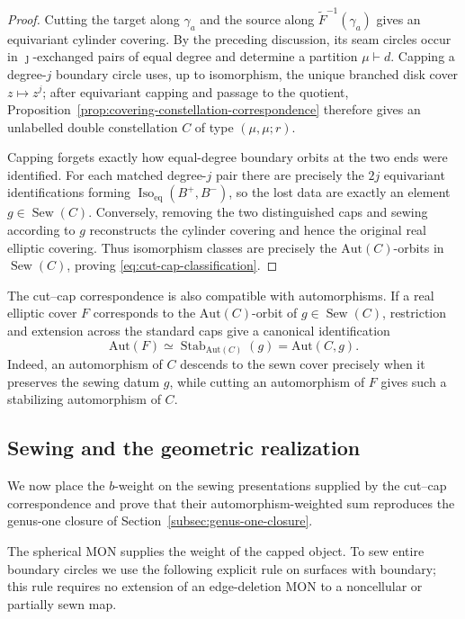 \documentclass[11pt,a4paper,reqno]{article}
\theoremstyle{definition}
\theoremstyle{remark}
\newcommand\Aut{{\mathrm{Aut}}}
\begin{document}
\begin{proof}
Cutting the target along $\gamma_a$ and the source along $\widetilde F^{-1}(\gamma_a)$ gives an equivariant cylinder covering.  By the preceding discussion, its seam circles occur in $\jmath$-exchanged pairs of equal degree and determine a partition $\mu\vdash d$.  Capping a degree-$j$ boundary circle uses, up to isomorphism, the unique branched disk cover $z\mapsto z^j$; after equivariant capping and passage to the quotient, Proposition~\ref{prop:covering-constellation-correspondence} therefore gives an unlabelled double constellation $C$ of type $(\mu,\mu;r)$.

Capping forgets exactly how equal-degree boundary orbits at the two ends were identified.  For each matched degree-$j$ pair there are precisely the $2j$ equivariant identifications forming $\operatorname{Iso}_{\mathrm{eq}}(B^+,B^-)$, so the lost data are exactly an element $g\in\operatorname{Sew}(C)$.  Conversely, removing the two distinguished caps and sewing according to $g$ reconstructs the cylinder covering and hence the original real elliptic covering.  Thus isomorphism classes are precisely the $\Aut(C)$-orbits in $\operatorname{Sew}(C)$, proving \eqref{eq:cut-cap-classification}.

\end{proof}

The cut--cap correspondence is also compatible with automorphisms.  If a real elliptic cover $F$ corresponds to the $\Aut(C)$-orbit of $g\in\operatorname{Sew}(C)$, restriction and extension across the standard caps give a canonical identification
\[
\Aut(F)\simeq\operatorname{Stab}_{\Aut(C)}(g)=\Aut(C,g).
\]
Indeed, an automorphism of $C$ descends to the sewn cover precisely when it preserves the sewing datum $g$, while cutting an automorphism of $F$ gives such a stabilizing automorphism of $C$.

\subsection{Sewing and the geometric realization}\label{subsec:geometric-sewing}

We now place the $b$-weight on the sewing presentations supplied by the cut--cap correspondence and prove that their automorphism-weighted sum reproduces the genus-one closure of Section~\ref{subsec:genus-one-closure}.

The spherical MON supplies the weight of the capped object.  To sew entire boundary circles we use the following explicit rule on surfaces with boundary; this rule requires no extension of an edge-deletion MON to a noncellular or partially sewn map.
\end{document}
